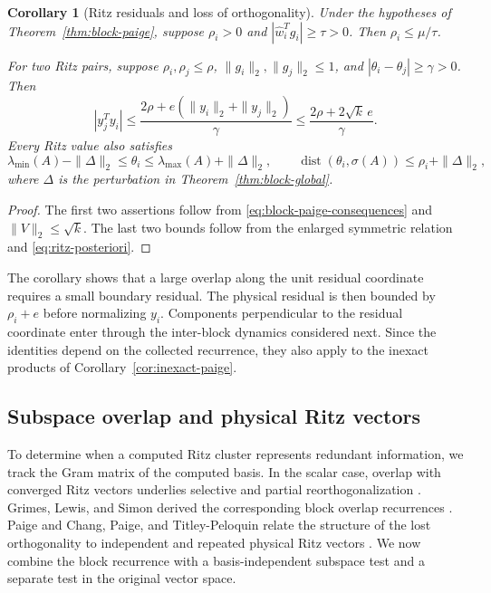 \documentclass[11pt]{article}
\newtheorem{corollary}{Corollary}
\theoremstyle{definition}
\begin{document}
\begin{corollary}[Ritz residuals and loss of orthogonality]
\label{cor:block-paige-consequences}
Under the hypotheses of Theorem~\ref{thm:block-paige}, suppose
$\rho_i>0$ and $|\hat w_i^Tg_i|\ge\tau>0$.  Then
$\rho_i\le\mu/\tau$.

For two Ritz pairs, suppose $\rho_i,\rho_j\le\rho$,
$\|g_i\|_2,\|g_j\|_2\le1$, and
$|\theta_i-\theta_j|\ge\gamma>0$.  Then
\[
 |y_j^Ty_i|
 \le\frac{2\rho+e(\|y_i\|_2+\|y_j\|_2)}{\gamma}
 \le\frac{2\rho+2\sqrt{k}\,e}{\gamma}.
\]
Every Ritz value also satisfies
\[
\lambda_{\min}(A)-\|\Delta\|_2\le\theta_i
 \le\lambda_{\max}(A)+\|\Delta\|_2,
\qquad
\operatorname{dist}(\theta_i,\sigma(A))\le\rho_i+\|\Delta\|_2,
\]
where $\Delta$ is the perturbation in Theorem~\ref{thm:block-global}.
\end{corollary}

\begin{proof}
The first two assertions follow from
\eqref{eq:block-paige-consequences} and $\|V\|_2\le\sqrt{k}$.
The last two bounds follow from the enlarged symmetric relation and
\eqref{eq:ritz-posteriori}.
\end{proof}

The corollary shows that a large overlap
along the unit residual coordinate requires a small boundary residual.
The physical residual is then bounded by $\rho_i+e$ before normalizing
$y_i$.  Components perpendicular to the residual coordinate enter through
the inter-block dynamics considered next.  Since the identities depend
on the collected recurrence, they also apply to the inexact products of
Corollary~\ref{cor:inexact-paige}.

\subsection{Subspace overlap and physical Ritz vectors}

To determine when a computed Ritz cluster represents redundant information,
we track the Gram matrix of the computed basis.  In the scalar case,
overlap with converged Ritz vectors underlies selective and partial
reorthogonalization \cite{Paige1976,ParlettScott1979,Simon1984Reorth}.
Grimes, Lewis, and Simon derived the corresponding block overlap recurrences
\cite{GrimesLewisSimon1994}.  Paige and Chang, Paige, and Titley-Peloquin
relate the structure of the lost orthogonality to independent and repeated
physical Ritz vectors \cite{Paige2019,ChangPaigeTitleyPeloquin2021}.
We now combine the block recurrence with a
basis-independent subspace test and a separate test in the original vector
space.
\end{document}
